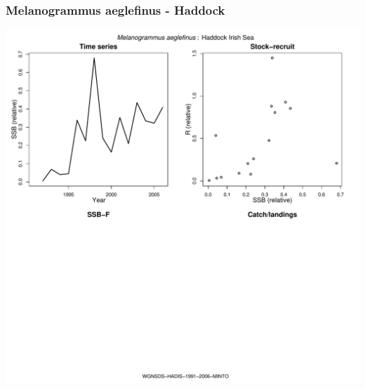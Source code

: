 \subsubsection{Melanogrammus aeglefinus - Haddock}
\begin{center}
\includegraphics[width=1.2\textwidth]{../R/figures/WGNSDS-HADIS-1991-2006-MINTO.pdf}
\end{center}

